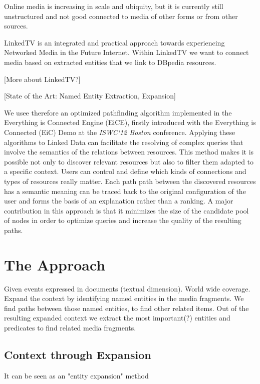 \documentclass{acm_proc_article-sp}
\begin{document}
Online media is increasing in scale and ubiquity, but it is currently still unstructured and not good connected to media of other forms or from other sources.

LinkedTV is an integrated and practical approach towards experiencing Networked Media in the Future Internet. Within LinkedTV we want to connect media based on extracted entities that we link to DBpedia resources.

[More about LinkedTV?]

[State of the Art: Named Entity Extraction, Expansion]


We usee therefore an optimized pathfinding algorithm \cite{de2013discovering} implemented in the Everything is Connected Engine (EiCE), firstly introduced with the Everything is Connected (EiC) Demo at the \emph{ISWC`12 Boston} conference.
Applying these algorithms to Linked Data can facilitate the resolving of complex queries that involve the semantics of the relations between resources. This method makes it is possible not only to discover relevant resources but also to filter them adapted to a specific context. Users can control and define which kinds of connections and types of resources really matter. Each path path between the discovered resources has a semantic meaning can be traced back to the original configuration of the user and
forms the basis of an explanation rather than a ranking. A major
contribution in this approach is that it minimizes the size of the candidate pool of nodes in order to optimize queries and increase
the quality of the resulting paths.

\section{The Approach}

Given events expressed in documents (textual dimension). 
World wide coverage.
Expand the context by identifying named entities in the media fragments.
We find paths between those named entities, to find other related items.
Out of the resulting expanded context we extract the most important(?) entities and predicates to find related media fragments.

\subsection{Context through Expansion}

It can be seen as an "entity expansion" method
\end{document}
